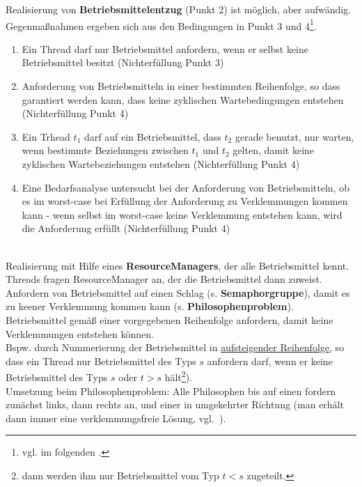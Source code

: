 \noindent
Realisierung von \textbf{Betriebsmittelentzug} (Punkt 2) ist möglich, aber aufwändig.\\

\noindent
Gegenmaßnahmen ergeben sich aus den Bedingungen in Punkt 3 und 4\footnote{
vgl. im folgenden \cite[192 f.]{Oec22}.
}.\\

\begin{enumerate}
    \item Ein Thread darf nur Betriebsmittel anfordern, wenn er selbst keine Betriebsmittel besitzt (Nichterfüllung Punkt 3)
    \item Anforderung von Betriebsmitteln in einer bestimmten Reihenfolge, so dass garantiert werden kann, dass keine zyklischen Wartebedingungen entstehen (Nichterfüllung Punkt 4)
    \item Ein Trhead $t_1$ darf auf ein Betriebsmittel, dass $t_2$ gerade benutzt, nur warten, wenn bestimmte Beziehungen zwischen $t_1$ und $t_2$ gelten, damit keine zyklischen Wartebeziehungen entstehen (Nichterfüllung Punkt 4)
    \item Eine Bedarfsanalyse untersucht bei der Anforderung von Betriebsmitteln, ob es im worst-case bei Erfüllung der Anforderung zu Verklemmungen kommen kann - wenn selbst im worst-case keine Verklemmung entstehen kann, wird die Anforderung erfüllt (Nichterfüllung Punkt 4)
\end{enumerate}\\

\noindent
Realisierung mit Hilfe eines \textbf{ResourceManagers}, der alle Betriebsmittel kennt.\\

\noindent
Threads fragen ResourceManager an, der die Betriebsmittel dann zuweist.\\

\noindent
Anfordern von Betriebsmittel auf einen Schlag (s. \textbf{Semaphorgruppe}), damit es zu keener Verklemmung kommen kann (s. \textbf{Philosophenproblem}).\\

\noindent
Betriebsmittel gemäß einer vorgegebenen Reihenfolge anfordern, damit keine Verklemmungen entstehen können.\\
Bspw. durch Nummerierung der Betriebsmittel in \underline{aufsteigender Reihenfolge}, so dass ein Thread nur Betriebsmittel des Typs $s$ anfordern darf, wenn er keine Betriebsmittel des Typs $s$ oder $t > s$ hält\footnote{
    dann werden ihm nur Betriebsmittel vom Typ $t < s$ zugeteilt.
}).\\
Umsetzung beim Philosophenproblem: Alle Philosophen bis auf einen fordern zunächst links, dann rechts an, und einer in umgekehrter Richtung (man erhält dann immer eine verklemmungsfreie Lösung, vgl.~\cite[197]{Oec22}).\\

